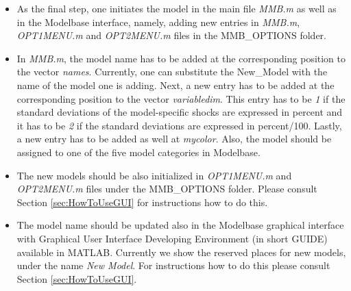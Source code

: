 
\begin{itemize}
\item As the final step, one initiates the model in the main file \textit{MMB.m} as well as in the Modelbase interface, namely, adding new entries in \textit{MMB.m}, \textit{ OPT1MENU.m} and \textit{OPT2MENU.m} files in the MMB\_OPTIONS folder.
\item In \textit{MMB.m}, the model name has to be added at the corresponding position to the vector \textit{names}. Currently, one can substitute the New\_Model with the name of the model one is adding.
  Next, a new entry has to be added at the corresponding position to the vector \textit{variabledim}. This entry has to be \textit{1} if the standard deviations of the model-specific shocks are expressed in percent and it has to be \textit{2} if the standard deviations are expressed in percent/100. Lastly, a new entry has to be added as well at \textit{mycolor}. Also, the model should be assigned to one of the five model categories in Modelbase.
\item The new models should be also initialized in \textit{OPT1MENU.m} and \textit{OPT2MENU.m} files under the MMB\_OPTIONS folder. Please consult Section \ref{sec:HowToUseGUI} for instructions how to do this.
\item The model name should be updated also in the Modelbase graphical interface with Graphical User Interface Developing Environment (in short GUIDE) available in MATLAB. Currently we show the reserved places for new models, under the name \textit{New Model}. For instructions how to do this please consult Section \ref{sec:HowToUseGUI}.
\end{itemize}

